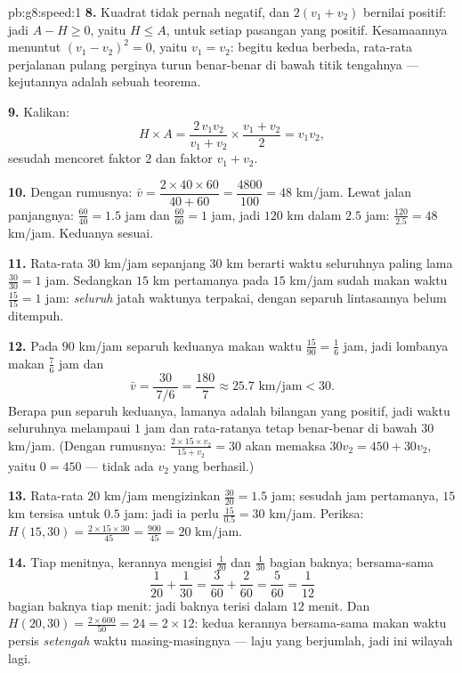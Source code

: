 \begin{solution}{pb:g8:speed:1}
\textbf{8.} Kuadrat tidak pernah negatif, dan $2(v_1 + v_2)$ bernilai
positif: jadi $A - H \geq 0$, yaitu $H \leq A$, untuk setiap pasangan
 yang positif. Kesamaannya menuntut $(v_1 - v_2)^2 = 0$,
yaitu $v_1 = v_2$: begitu kedua  berbeda, rata-rata
perjalanan pulang perginya turun benar-benar di bawah titik
tengahnya --- kejutannya adalah sebuah teorema.

\textbf{9.} Kalikan:
\[
H \times A
= \frac{2\, v_1 v_2}{v_1 + v_2} \times \frac{v_1 + v_2}{2}
= v_1 v_2 ,
\]
sesudah mencoret faktor $2$ dan faktor $v_1 + v_2$.

\textbf{10.} Dengan rumusnya: $\bar v = \dfrac{2 \times 40 \times 60}
{40 + 60} = \dfrac{4800}{100} = 48$ km/jam. Lewat jalan panjangnya:
$\frac{60}{40} = 1.5$ jam dan $\frac{60}{60} = 1$ jam, jadi $120$ km
dalam $2.5$ jam: $\frac{120}{2.5} = 48$ km/jam. Keduanya sesuai.

\textbf{11.} Rata-rata $30$ km/jam sepanjang $30$ km berarti waktu
seluruhnya paling lama $\frac{30}{30} = 1$ jam. Sedangkan $15$ km
pertamanya pada $15$ km/jam sudah makan waktu $\frac{15}{15} = 1$ jam:
\emph{seluruh} jatah waktunya terpakai, dengan separuh lintasannya
belum ditempuh.

\textbf{12.} Pada $90$ km/jam separuh keduanya makan waktu
$\frac{15}{90} = \frac16$ jam, jadi lombanya makan $\frac76$ jam dan
\[
\bar v = \frac{30}{\ 7/6\ } = \frac{180}{7} \approx 25.7
\text{ km/jam} < 30 .
\]
Berapa pun  separuh keduanya, lamanya adalah bilangan yang
positif, jadi waktu seluruhnya melampaui $1$ jam dan rata-ratanya
tetap benar-benar di bawah $30$ km/jam. (Dengan rumusnya:
$\frac{2 \times 15 \times v_2}{15 + v_2} = 30$ akan memaksa
$30 v_2 = 450 + 30 v_2$, yaitu $0 = 450$ --- tidak ada 
$v_2$ yang berhasil.)

\textbf{13.} Rata-rata $20$ km/jam mengizinkan $\frac{30}{20} = 1.5$
jam; sesudah jam pertamanya, $15$ km tersisa untuk $0.5$ jam: jadi ia
perlu $\frac{15}{0.5} = 30$ km/jam. Periksa:
$H(15, 30) = \frac{2 \times 15 \times 30}{45} = \frac{900}{45}
= 20$ km/jam.

\textbf{14.} Tiap menitnya, kerannya mengisi $\frac{1}{20}$ dan
$\frac{1}{30}$ bagian baknya; bersama-sama
\[
\frac{1}{20} + \frac{1}{30}
= \frac{3}{60} + \frac{2}{60}
= \frac{5}{60} = \frac{1}{12}
\]
bagian baknya tiap menit: jadi baknya terisi dalam $12$ menit. Dan
$H(20, 30) = \frac{2 \times 600}{50} = 24 = 2 \times 12$: kedua
kerannya bersama-sama makan waktu persis \emph{setengah } waktu masing-masingnya --- laju yang berjumlah, jadi ini
wilayah  lagi.


\end{solution}
